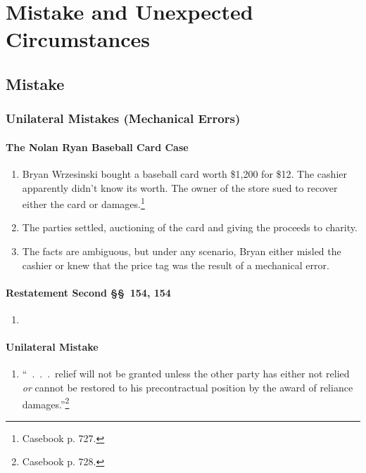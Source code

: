 \section{Mistake and Unexpected Circumstances}

\subsection{Mistake}

\subsubsection{Unilateral Mistakes (Mechanical Errors)}

\paragraph{The Nolan Ryan Baseball Card Case}

\begin{enumerate}
    \item Bryan Wrzesinski bought a baseball card worth \$1,200 for \$12. The 
    cashier apparently didn't know its worth. The owner of the store sued to 
    recover either the card or damages.\footnote{Casebook p. 727.}
    \item The parties settled, auctioning of the card and giving the proceeds 
    to charity.
    \item The facts are ambiguous, but under any scenario, Bryan either misled 
    the cashier or knew that the price tag was the result of a mechanical 
    error.
\end{enumerate}

\paragraph{Restatement Second \S\S\ 154, 154}

\begin{enumerate}
    \item %
\end{enumerate}

\paragraph{Unilateral Mistake}

\begin{enumerate}
    \item ``~.~.~.~relief will not be granted unless the other party has 
    either not relied \emph{or} cannot be restored to his precontractual 
    position by the award of reliance damages.''\footnote{Casebook p. 728.}
\end{enumerate}

